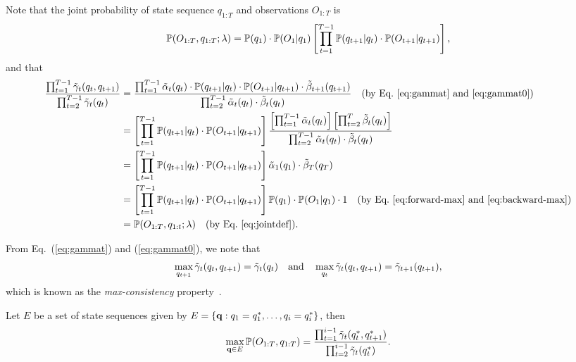 Note that the joint probability of state sequence $q_{1:T}$ and observations $O_{1:T}$ is
\begin{equation}
\label{eq:jointdef}
\mathbb{P}(O_{1:T}, q_{1:T} ;\lambda) = \mathbb{P}(q_1) \cdot \mathbb{P}(O_1 |q_1) \left[ \prod_{t=1}^{T-1} \mathbb{P}(q_{t+1} |q_t) \cdot \mathbb{P}(O_{t+1} |q_{t+1}) \right],
\end{equation}
and that
\begin{equation}
\label{eq:jointp}
\begin{aligned}
\frac{\prod_{t=1}^{T-1} \tilde{\gamma}_t(q_t, q_{t+1})} {\prod_{t=2}^{T-1} \tilde{\gamma}_t(q_t)} 
&= \frac{\prod_{t=1}^{T-1} \tilde{\alpha}_t(q_t) \cdot \mathbb{P}(q_{t+1} |q_t) \cdot \mathbb{P}(O_{t+1} |q_{t+1}) \cdot \tilde{\beta}_{t+1}(q_{t+1})}
        {\prod_{t=2}^{T-1} \tilde{\alpha}_t(q_t) \cdot \tilde{\beta}_t(q_t)} 
   ~~~ \text{(by Eq.~\ref{eq:gammat} and \ref{eq:gammat0})} \\
&= \left[ \prod_{t=1}^{T-1} \mathbb{P}(q_{t+1} |q_t) \cdot \mathbb{P}(O_{t+1} |q_{t+1}) \right]
   \frac{ \left[ \prod_{t=1}^{T-1} \tilde{\alpha}_t(q_t) \right] \left[ \prod_{t=2}^T \tilde{\beta}_t(q_t) \right] }
        {\prod_{t=2}^{T-1} \tilde{\alpha}_t(q_t) \cdot \tilde{\beta}_t(q_t)} \\
&= \left[ \prod_{t=1}^{T-1} \mathbb{P}(q_{t+1} |q_t) \cdot \mathbb{P}(O_{t+1} |q_{t+1}) \right] \tilde{\alpha}_1(q_1) \cdot \tilde{\beta}_T(q_T) \\
&= \left[ \prod_{t=1}^{T-1} \mathbb{P}(q_{t+1} |q_t) \cdot \mathbb{P}(O_{t+1} |q_{t+1}) \right] \mathbb{P}(q_1) \cdot \mathbb{P}(O_1 |q_1) \cdot 1 
   ~~~ \text{(by Eq.~\ref{eq:forward-max} and \ref{eq:backward-max})} \\
&= \mathbb{P}(O_{1:T}, q_{1:t} ;\lambda) ~~~ \text{(by Eq.~\ref{eq:jointdef})}.
\end{aligned}
\end{equation}

From Eq.~(\ref{eq:gammat}) and (\ref{eq:gammat0}), we note that 
\begin{equation}
\label{eq:maxconsist}
\max_{q_{t+1}} \tilde{\gamma}_t(q_t, q_{t+1}) = \tilde{\gamma}_t(q_t) 
~~~ \text{and} ~~~
\max_{q_t} \tilde{\gamma}_t(q_t, q_{t+1}) = \tilde{\gamma}_{t+1}(q_{t+1}),
\end{equation}
which is known as the \emph{max-consistency} property~\cite{nilsson2001sequentially}.

\begin{lemma}
\label{lm:1}
Let $E$ be a set of state sequences given by $E = \{\mathbf{q} :q_1 = q_1^*, \dots, q_i = q_i^* \}$, then
\begin{equation*}
\max_{\mathbf{q} \in E} \mathbb{P}(O_{1:T}, q_{1:T}) = \frac{\prod_{t=1}^{i-1} \tilde{\gamma}_t(q_t^*, q_{t+1}^*)} {\prod_{t=2}^{i-1} \tilde{\gamma}_t(q_t^*)}.
\end{equation*}
\end{lemma}

